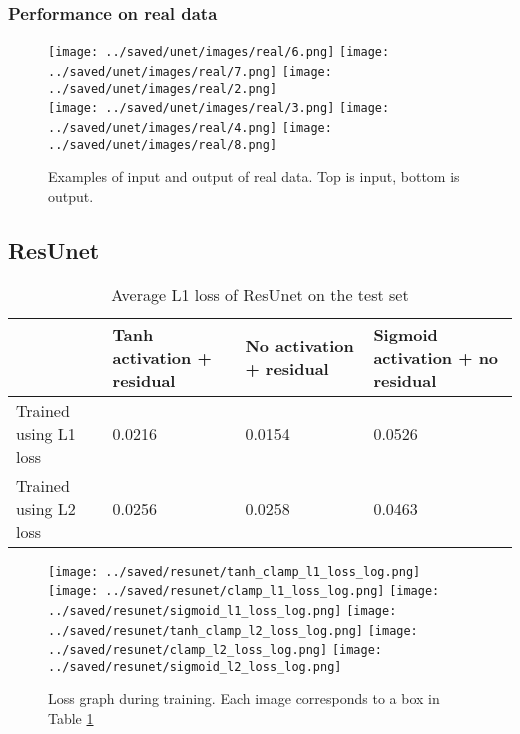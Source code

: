 \subsubsection{Performance on real data}
\begin{figure}[H]
  \centering
  \captionsetup{justification=centering}
  \texttt{[image: ../saved/unet/images/real/6.png]}
  \texttt{[image: ../saved/unet/images/real/7.png]}
  \texttt{[image: ../saved/unet/images/real/2.png]}\\
  \texttt{[image: ../saved/unet/images/real/3.png]}
  \texttt{[image: ../saved/unet/images/real/4.png]}
  \texttt{[image: ../saved/unet/images/real/8.png]}
  \caption[center]{Examples of input and output of real data. Top is input, bottom is output.}\label{image:unet_real_images}
\end{figure}


\subsection{ResUnet}
\begin{table}[H]
  \begin{tabular}{|l|l|l|l|}
    \hline
    & Tanh activation + residual & No activation + residual & Sigmoid activation + no residual \\ \hline
    Trained using L1 loss & 0.0216 & 0.0154 & 0.0526 \\ \hline
    Trained using L2 loss & 0.0256 & 0.0258 & 0.0463 \\ \hline
  \end{tabular}
  \caption{Average L1 loss of ResUnet on the test set}\label{fig:resunet_perf}
\end{table}

\begin{figure}[H]
  \centering
  \captionsetup{justification=centering}
  \texttt{[image: ../saved/resunet/tanh\_clamp\_l1\_loss\_log.png]}
  \texttt{[image: ../saved/resunet/clamp\_l1\_loss\_log.png]}
  \texttt{[image: ../saved/resunet/sigmoid\_l1\_loss\_log.png]}
  \texttt{[image: ../saved/resunet/tanh\_clamp\_l2\_loss\_log.png]}
  \texttt{[image: ../saved/resunet/clamp\_l2\_loss\_log.png]}
  \texttt{[image: ../saved/resunet/sigmoid\_l2\_loss\_log.png]}
  \caption[center]{Loss graph during training. Each image corresponds to a box in Table \ref{fig:resunet_perf}}\label{image:resunet_loss}
\end{figure}

